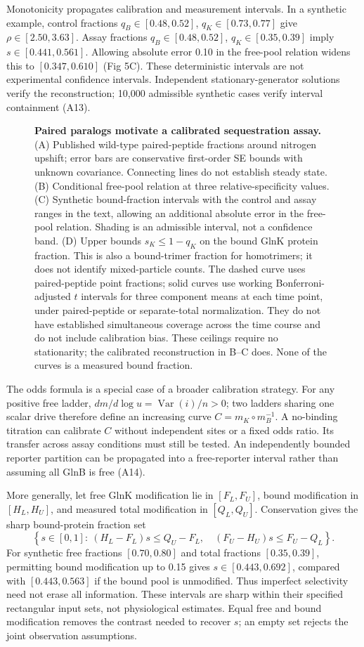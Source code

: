 \documentclass[10pt,letterpaper]{article}
\begin{document}
Monotonicity propagates calibration and measurement intervals. In a synthetic example, control fractions $q_B\in[0.48,0.52]$, $q_K\in[0.73,0.77]$ give $\rho\in[2.50,3.63]$. Assay fractions $q_B\in[0.48,0.52]$, $q_K\in[0.35,0.39]$ imply $s\in[0.441,0.561]$. Allowing absolute error 0.10 in the free-pool relation widens this to $[0.347,0.610]$ (Fig 5C). These deterministic intervals are not experimental confidence intervals. Independent stationary-generator solutions verify the reconstruction; 10,000 admissible synthetic cases verify interval containment (A13).

\begin{figure}[!ht]\centering
\caption{\textbf{Paired paralogs motivate a calibrated sequestration assay.} (A) Published wild-type paired-peptide fractions around nitrogen upshift; error bars are conservative first-order SE bounds with unknown covariance. Connecting lines do not establish steady state. (B) Conditional free-pool relation at three relative-specificity values. (C) Synthetic bound-fraction intervals with the control and assay ranges in the text, allowing an additional absolute error in the free-pool relation. Shading is an admissible interval, not a confidence band. (D) Upper bounds $s_K\leq1-q_K$ on the bound GlnK protein fraction. This is also a bound-trimer fraction for homotrimers; it does not identify mixed-particle counts. The dashed curve uses paired-peptide point fractions; solid curves use working Bonferroni-adjusted $t$ intervals for three component means at each time point, under paired-peptide or separate-total normalization. They do not have established simultaneous coverage across the time course and do not include calibration bias. These ceilings require no stationarity; the calibrated reconstruction in B--C does. None of the curves is a measured bound fraction.}
\end{figure}

The odds formula is a special case of a broader calibration strategy. For any positive free ladder, $d m/d\log u=\operatorname{Var}(i)/n>0$; two ladders sharing one scalar drive therefore define an increasing curve $C=m_K\circ m_B^{-1}$. A no-binding titration can calibrate $C$ without independent sites or a fixed odds ratio. Its transfer across assay conditions must still be tested. An independently bounded reporter partition can be propagated into a free-reporter interval rather than assuming all GlnB is free (A14).

More generally, let free GlnK modification lie in $[F_L,F_U]$, bound modification in $[H_L,H_U]$, and measured total modification in $[Q_L,Q_U]$. Conservation gives the sharp bound-protein fraction set
\[
\left\{s\in[0,1]:\ (H_L-F_L)s\leq Q_U-F_L,\quad
(F_U-H_U)s\leq F_U-Q_L\right\}.
\]
For synthetic free fractions $[0.70,0.80]$ and total fractions $[0.35,0.39]$, permitting bound modification up to 0.15 gives $s\in[0.443,0.692]$, compared with $[0.443,0.563]$ if the bound pool is unmodified. Thus imperfect selectivity need not erase all information. These intervals are sharp within their specified rectangular input sets, not physiological estimates. Equal free and bound modification removes the contrast needed to recover $s$; an empty set rejects the joint observation assumptions.
\end{document}
